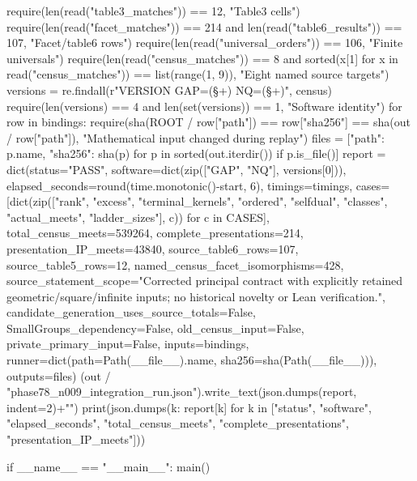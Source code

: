 \documentclass[11pt,a4paper]{article}
\begin{document}
\begin{CompleteProgram}
    require(len(read("table3_matches")) == 12, "Table3 cells")
    require(len(read("facet_matches")) == 214 and len(read("table6_results")) == 107, "Facet/table6 rows")
    require(len(read("universal_orders")) == 106, "Finite universals")
    require(len(read("census_matches")) == 8 and sorted(x[1] for x in read("census_matches")) == list(range(1, 9)), "Eight named source targets")
    versions = re.findall(r"VERSION GAP=(\S+) NQ=(\S+)", census)
    require(len(versions) == 4 and len(set(versions)) == 1, "Software identity")
    for row in bindings:
        require(sha(ROOT / row["path"]) == row["sha256"] == sha(out / row["path"]), "Mathematical input changed during replay")
    files = [{"path": p.name, "sha256": sha(p)} for p in sorted(out.iterdir()) if p.is_file()]
    report = dict(status="PASS", software=dict(zip(["GAP", "NQ"], versions[0])), elapsed_seconds=round(time.monotonic()-start, 6), timings=timings,
        cases=[dict(zip(["rank", "excess", "terminal_kernels", "ordered", "selfdual", "classes", "actual_meets", "ladder_sizes"], c)) for c in CASES],
        total_census_meets=539264, complete_presentations=214, presentation_IP_meets=43840,
        source_table6_rows=107, source_table5_rows=12, named_census_facet_isomorphisms=428,
        source_statement_scope="Corrected principal contract with explicitly retained geometric/square/infinite inputs; no historical novelty or Lean verification.",
        candidate_generation_uses_source_totals=False, SmallGroups_dependency=False, old_census_input=False, private_primary_input=False,
        inputs=bindings, runner=dict(path=Path(__file__).name, sha256=sha(Path(__file__))), outputs=files)
    (out / "phase78_n009_integration_run.json").write_text(json.dumps(report, indent=2)+"\n")
    print(json.dumps({k: report[k] for k in ["status", "software", "elapsed_seconds", "total_census_meets", "complete_presentations", "presentation_IP_meets"]}))


if __name__ == "__main__":
    main()
\end{CompleteProgram}
\end{document}
